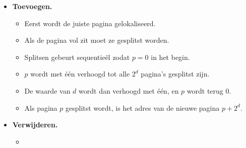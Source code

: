 \begin{itemize}
\begin{itemize}
        \item \textbf{Toevoegen.}
        \begin{itemize}
            \item Eerst wordt de juiste pagina gelokaliseerd.
            \item Als de pagina vol zit moet ze gesplitst worden.
            \item Splitsen gebeurt sequentieël zodat $p = 0$ in het begin.
            \item $p$ wordt met één verhoogd tot alle $2^d$ pagina's gesplitst zijn.
            \item De waarde van $d$ wordt dan verhoogd met één, en $p$ wordt terug 0.
            \item Als pagina $p$ gesplitst wordt, is het adres van de nieuwe pagina $p + 2^d$.
        \end{itemize}
        \item \textbf{Verwijderen.}
        \begin{itemize}
            \item 
        \end{itemize}
    \end{itemize}                                                                                                                                                           
\end{itemize}
